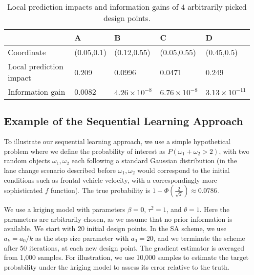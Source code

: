 \documentclass{wscpaperproc}
\theoremstyle{wsc}
\begin{document}
\begin{table}[ht]
\centering
\caption{Local prediction impacts and information gains of 4 arbitrarily picked design points.}
\renewcommand{\arraystretch}{1.5}
\label{table:exp3}
\begin{tabular}{|l|l|l|l|l|}
\hline
        & A          & B           & C           & D          \\ \hline
Coordinate   & (0.05,0.1) & (0.12,0.55) & (0.05,0.55) & (0.45,0.5) \\ \hline
Local prediction impact & 0.209   & 0.0996    & 0.0471   & 0.249   \\ \hline
Information gain    & 0.0082   & $4.26 \times 10^{-8}$    & $6.76 \times 10^{-8}$    & $3.13 \times 10^{-11}$   \\ \hline
\end{tabular}%
\end{table}

\subsection{Example of the Sequential Learning Approach}
To illustrate our sequential learning approach, we use a simple hypothetical problem where we define the probability of interest as $P(\omega_1 + \omega_2 > 2)$, with two random objects $\omega_1,\omega_2$ each following a standard Gaussian distribution (in the lane change scenario described before $\omega_1,\omega_2$ would correspond to the initial conditions such as frontal vehicle velocity, with a correspondingly more sophisticated $f$ function). The true probability is $1- \Phi (\frac{2}{\sqrt{2}}) \approx 0.0786$.

We use a kriging model with parameters $\beta=0$, $\tau^2=1$, and $\theta=1$. Here the parameters are arbitrarily chosen, as we assume that no prior information is available. We start with 20 initial design points. In the SA scheme, we use $a_k=a_0/k$ as the step size parameter with $a_0=20$, and we terminate the scheme after 50 iterations, at each new design point. The gradient estimator is averaged from 1,000 samples. For illustration, we use 10,000 samples to estimate the target probability under the kriging model to assess its error relative to the truth.  
\end{document}
